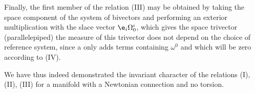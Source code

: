 Finally, the first member of the relation (III) may be obtained by taking the space component of the system of bivectors
and performing an exterior multiplication with the slace vector $\e_i \Omega_0^i$, which gives the space trivector (parallelepiped)
the measure of this trivector does not depend on the choice of reference system, since a  only adds terms containing $\omega^0$ and which will be zero according to (IV).

We have thus indeed demonstrated the invariant character of the relations (I), (II), (III) for a manifold with a Newtonian connection and no torsion.